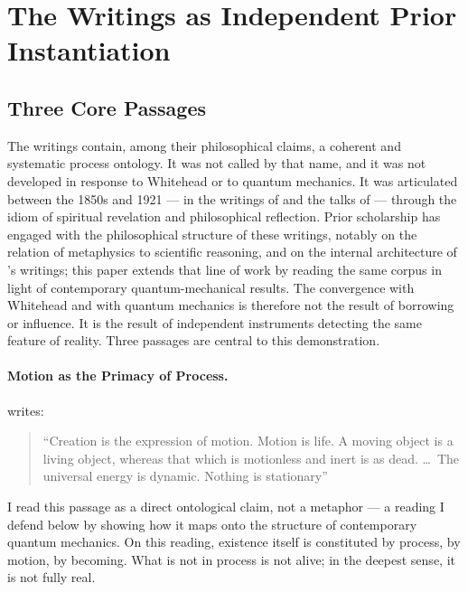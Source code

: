 
\section{The \bahai Writings as Independent Prior Instantiation}
\label{sec:bahai}


\subsection{Three Core Passages}

The \bahai writings contain, among their philosophical claims, a coherent
and systematic process ontology.
It was not called by that name, and it was not developed in response to
Whitehead or to quantum mechanics.
It was articulated between the 1850s and 1921 --- in the writings of
\Bahaullah and the talks of \AbdulBaha --- through the idiom of
spiritual revelation and philosophical reflection.
Prior \bahai scholarship has engaged with the philosophical structure of
these writings, notably \citet{Hatcher1990} on the relation of \bahai
metaphysics to scientific reasoning, and \citet{Saiedi2000} on the
internal architecture of \Bahaullah's writings; this paper extends
that line of work by reading the same corpus in light of contemporary
quantum-mechanical results.
The convergence with Whitehead and with quantum mechanics is therefore
not the result of borrowing or influence.
It is the result of independent instruments detecting the same feature
of reality.
Three passages are central to this demonstration.

\paragraph{Motion as the Primacy of Process.}
\AbdulBaha writes:
\begin{quote}
``Creation is the expression of motion. Motion is life. A moving object
is a living object, whereas that which is motionless and inert is as dead. \ldots\ The universal energy is dynamic.
Nothing is stationary''
\citep[Talk 52]{PUP}
\end{quote}

I read this passage as a direct ontological claim, not a metaphor ---
a reading I defend below by showing how it maps onto the structure of
contemporary quantum mechanics.
On this reading, existence itself is constituted by process, by motion,
by becoming.
What is not in process is not alive; in the deepest sense, it is not
fully real.

